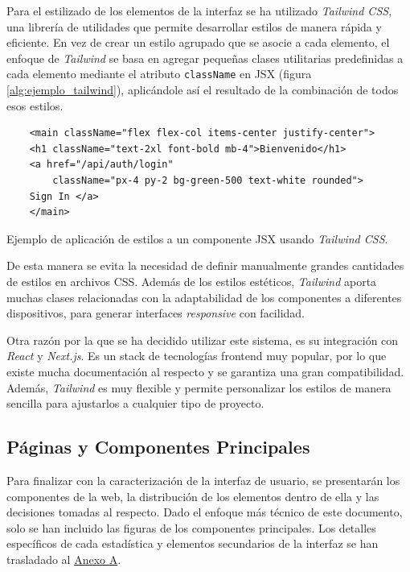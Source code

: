 Para el estilizado de los elementos de la interfaz se ha utilizado \textit{Tailwind CSS}, una librería de utilidades que permite desarrollar estilos de manera rápida y eficiente. En vez de crear un estilo agrupado que se asocie a cada elemento, el enfoque de \textit{Tailwind} se basa en agregar pequeñas clases utilitarias predefinidas a cada elemento mediante el atributo \texttt{className} en JSX (figura \ref{alg:ejemplo_tailwind}), aplicándole así el resultado de la combinación de todos esos estilos.

\setlength{\intextsep}{15pt} %
\setlength{\abovecaptionskip}{0pt} %
\setlength{\belowcaptionskip}{0pt} %

\begin{ifalgorithm}[H]
    \begin{lstlisting}
    <main className="flex flex-col items-center justify-center">
    <h1 className="text-2xl font-bold mb-4">Bienvenido</h1>
    <a href="/api/auth/login"
        className="px-4 py-2 bg-green-500 text-white rounded">
    Sign In </a>
    </main>
    \end{lstlisting}
    \caption{Ejemplo de aplicación de estilos a un componente JSX usando \textit{Tailwind CSS}.}
    \label{alg:ejemplo_tailwind}
\end{ifalgorithm}

De esta manera se evita la necesidad de definir manualmente grandes cantidades de estilos en archivos CSS. Además de los estilos estéticos, \textit{Tailwind} aporta muchas clases relacionadas con la adaptabilidad de los componentes a diferentes dispositivos, para generar interfaces \textit{responsive} con facilidad.

Otra razón por la que se ha decidido utilizar este sistema, es su integración con \textit{React} y \textit{Next.js}. Es un stack de tecnologías frontend muy popular, por lo que existe mucha documentación al respecto y se garantiza una gran compatibilidad. Además, \textit{Tailwind} es muy flexible y permite personalizar los estilos de manera sencilla para ajustarlos a cualquier tipo de proyecto.

\subsection{Páginas y Componentes Principales}

Para finalizar con la caracterización de la interfaz de usuario, se presentarán los componentes de la web, la distribución de los elementos dentro de ella y las decisiones tomadas al respecto. Dado el enfoque más técnico de este documento, solo se han incluido las figuras de los componentes principales. Los detalles específicos de cada estadística y elementos secundarios de la interfaz se han trasladado al \hyperref[ch:anexoA]{Anexo A}.

